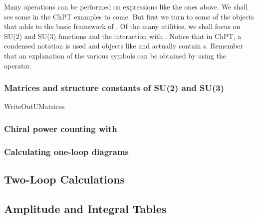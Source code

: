 
Many operations can be performed on expressions like the ones above. We shall see some in the ChPT examples to come. But first we turn to some of the objects that \fphi adds to the basic framework of \fc. Of the many utilities, we shall focus on SU(2) and SU(3) functions and the interaction with \fa. Notice that in ChPT, a condensed notation is used and objects like  and  actually contain s. Remember that an explanation of the various symbols can be obtained by using the  operator.

\subsubsection{Matrices and structure constants of SU(2) and SU(3)}

WriteOutUMatrices

\subsubsection{Chiral power counting with \fa}

\subsubsection{Calculating one-loop diagrams}

\subsection{Two-Loop Calculations}

\subsection{Amplitude and Integral Tables}
